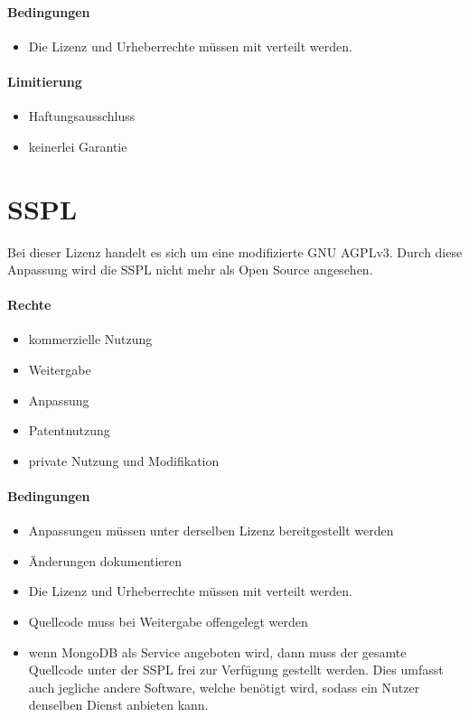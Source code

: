 \paragraph{Bedingungen}
\begin{itemize}
    \item Die Lizenz und Urheberrechte müssen mit verteilt werden.
\end{itemize}

\paragraph{Limitierung}
\begin{itemize}
    \item Haftungsausschluss
    \item keinerlei Garantie
\end{itemize}


\section{\acf{SSPL}}\label{sec:server-side-public-license}
Bei dieser Lizenz handelt es sich um eine modifizierte GNU AGPLv3.
Durch diese Anpassung wird die \ac{SSPL} nicht mehr als Open Source angesehen.\cite{osi-sspl}

\paragraph{Rechte}
\begin{itemize}
    \item kommerzielle Nutzung
    \item Weitergabe
    \item Anpassung
    \item Patentnutzung
    \item private Nutzung und Modifikation
\end{itemize}
\paragraph{Bedingungen}
\begin{itemize}
    \item Anpassungen müssen unter derselben Lizenz bereitgestellt werden
    \item Änderungen dokumentieren
    \item Die Lizenz und Urheberrechte müssen mit verteilt werden.
    \item Quellcode muss bei Weitergabe offengelegt werden
    \item wenn MongoDB als Service angeboten wird, dann muss der gesamte Quellcode unter der
    \ac{SSPL} frei zur Verfügung gestellt werden.
    Dies umfasst auch jegliche andere Software, welche benötigt wird, sodass ein Nutzer denselben Dienst anbieten kann.
\end{itemize}

